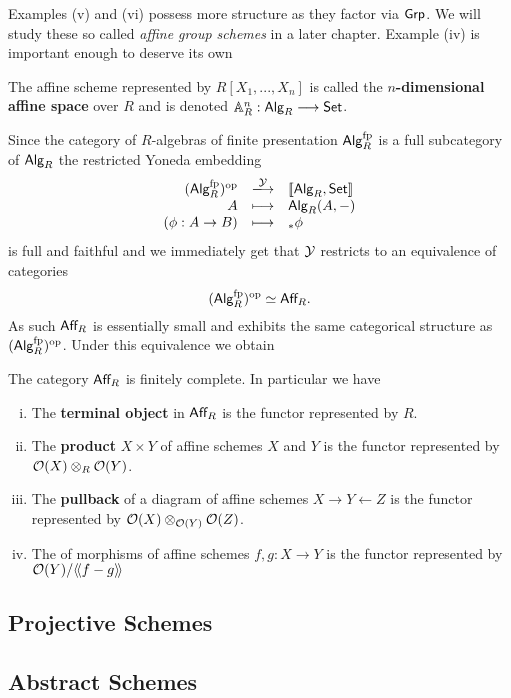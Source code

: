 	Examples (v) and (vi) possess more structure as they factor via $\textsf{Grp}$. We will study these so called \textit{affine group schemes} in a later chapter. Example (iv) is important enough to deserve its own
	\begin{definition}
		The affine scheme represented by $R[X_1,...,X_n]$ is called the \textbf{$n$-dimensional affine space} over $R$ and is denoted $\mathbb{A}_R^n:\textsf{Alg}_R \longrightarrow \textsf{Set}$.
	\end{definition}

	Since the category of $R$-algebras of finite presentation $\textsf{Alg}_R^{\text{fp}}$ is a full subcategory of $\textsf{Alg}_R$ the restricted Yoneda embedding
	\begin{equation*}
		\begin{array}{rcl}
			(\ncat{Alg}_R^\fp)^\op & \xlongrightarrow{\fun{Y}} & [\![\ncat{Alg}_R,\ncat{Set}]\!]\\
			A & \longmapsto & \ncat{Alg}_R(A,-)\\
			(\phi:A\rightarrow B) & \longmapsto & \pre\phi
		\end{array}
	\end{equation*}
	is full and faithful and we immediately get that $\mathcal{Y}$ restricts to an equivalence of categories 
	\begin{equation*}
		(\textsf{Alg}_R^{\text{fp}})^{\text{op}} \simeq \textsf{Aff}_R.
	\end{equation*}
	As such $\textsf{Aff}_R$ is essentially small and exhibits the same categorical structure as $(\textsf{Alg}_R^{\text{fp}})^{\text{op}}$. Under this equivalence we obtain

	\begin{lemma}
		The category $\textsf{Aff}_R$ is finitely complete. In particular we have
		\begin{enumerate}[(i)]
			\item{
				The \textbf{terminal object} in $\textsf{Aff}_R$ is the functor represented by $R$.
			}
			\item{
				The \textbf{product} $X \times Y$ of affine schemes $X$ and $Y$ is the functor represented by $\mathcal{O}(X)\otimes_R\mathcal{O}(Y)$.
			}
			\item{
				The \textbf{pullback} of a diagram of affine schemes $X \rightarrow Y \leftarrow Z$ is the functor represented by $\mathcal{O}(X) \otimes_{\mathcal{O}(Y)} \mathcal{O}(Z)$.
			}
			\item{
				The  of morphisms of affine schemes $f,g:X \rightarrow Y$ is the functor represented by $\mathcal{O}(Y)/\langle\!\langle f-g \rangle\!\rangle$
			}
		\end{enumerate}
	\end{lemma}

	\subsection{Projective Schemes}

	\subsection{Abstract Schemes}
